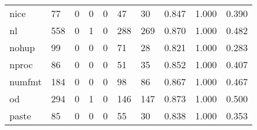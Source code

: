 \begin{longtable}{lp{1.3cm}p{1.3cm}p{1.3cm}p{1.3cm}p{1.3cm}p{1.3cm}p{1.3cm}p{1.3cm}p{1.3cm}}
nice      &                     77 &                                             0 &                                            0 &                                           0 &                                           47 &                                         30 &                                0.847 &                                  1.000 &                                0.390 \\
nl        &                    558 &                                             0 &                                            1 &                                           0 &                                          288 &                                        269 &                                0.870 &                                  1.000 &                                0.482 \\
nohup     &                     99 &                                             0 &                                            0 &                                           0 &                                           71 &                                         28 &                                0.821 &                                  1.000 &                                0.283 \\
nproc     &                     86 &                                             0 &                                            0 &                                           0 &                                           51 &                                         35 &                                0.852 &                                  1.000 &                                0.407 \\
numfmt    &                    184 &                                             0 &                                            0 &                                           0 &                                           98 &                                         86 &                                0.867 &                                  1.000 &                                0.467 \\
od        &                    294 &                                             0 &                                            1 &                                           0 &                                          146 &                                        147 &                                0.873 &                                  1.000 &                                0.500 \\
paste     &                     85 &                                             0 &                                            0 &                                           0 &                                           55 &                                         30 &                                0.838 &                                  1.000 &                                0.353 \\

\end{longtable}
